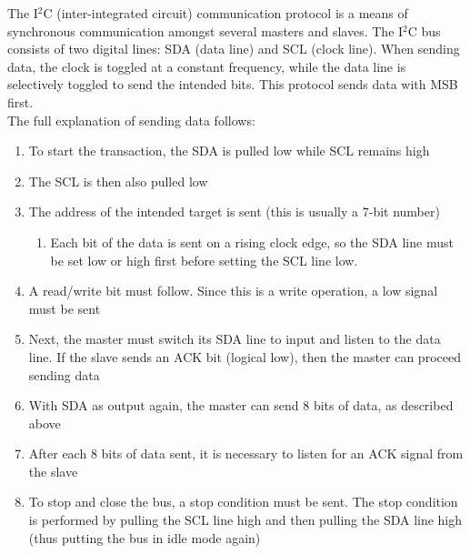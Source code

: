 \documentclass{article}
\begin{document}
The I\(^2\)C (inter-integrated circuit) communication protocol is a means of synchronous communication amongst several masters and slaves. The I\(^2\)C bus consists of two digital lines: SDA (data line) and SCL (clock line). When sending data, the clock is toggled at a constant frequency, while the data line is selectively toggled to send the intended bits. This protocol sends data with MSB first.\\

\noindent The full explanation of sending data follows:

\begin{enumerate}
	\item To start the transaction, the SDA is pulled low while SCL remains high
	\item The SCL is then also pulled low
	\item The address of the intended target is sent (this is usually a 7-bit number)
	\begin{enumerate}
		\item Each bit of the data is sent on a rising clock edge, so the SDA line must be set low or high first before setting the SCL line low.
	\end{enumerate}
	\item A read/write bit must follow. Since this is a write operation, a low signal must be sent
	\item Next, the master must switch its SDA line to input and listen to the data line. If the slave sends an ACK bit (logical low), then the master can proceed sending data
	\item With SDA as output again, the master can send 8 bits of data, as described above
	\item After each 8 bits of data sent, it is necessary to listen for an ACK signal from the slave
	\item To stop and close the bus, a stop condition must be sent. The stop condition is performed by pulling the SCL line high and then pulling the SDA line high (thus putting the bus in idle mode again)
\end{enumerate}


\end{document}
